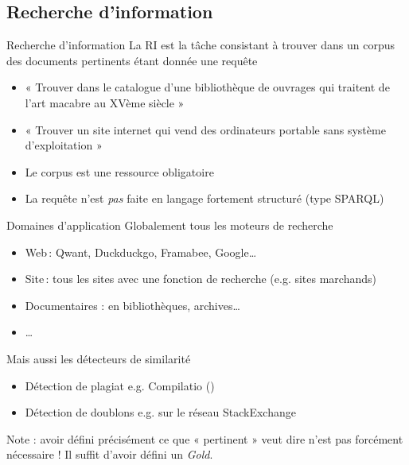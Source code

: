 \documentclass[hyperref={unicode}, xcolor={svgnames}]{beamer}
\begin{document}
\subsection{Recherche d'information}

\begin{frame}[fragile=singleslide]{Recherche d'information}
    La RI est la tâche consistant à trouver dans un corpus des documents \alert{pertinents} étant donnée une requête
    \begin{itemize}
        \item « Trouver dans le catalogue d'une bibliothèque de ouvrages qui traitent de l'art macabre au XVème siècle »
        \item « Trouver un site internet qui vend des ordinateurs portable sans système d'exploitation »
    \end{itemize}
    \begin{figure}
    \end{figure}
    \begin{itemize}
        \item Le \textcolor{highlight1}{corpus} est une ressource obligatoire
        \item La \textcolor{highlight4}{requête} n'est \emph{pas} faite en langage fortement structuré (type SPARQL)
    \end{itemize}
\end{frame}

\begin{frame}{Domaines d'application}
    Globalement tous les moteurs de recherche
    \begin{itemize}
        \item Web : Qwant, Duckduckgo, Framabee, Google…
        \item Site : tous les sites avec une fonction de recherche (e.g. sites marchands)
        \item Documentaires : en bibliothèques, archives…
        \item …
    \end{itemize}
    Mais aussi les détecteurs de similarité
    \begin{itemize}
        \item Détection de plagiat e.g. Compilatio ()
        \item Détection de doublons e.g. sur le réseau StackExchange
    \end{itemize}
    Note : avoir défini précisément ce que « pertinent » veut dire n'est pas forcément nécessaire ! Il suffit d'avoir défini un \textit{Gold}.
\end{frame}
\end{document}
